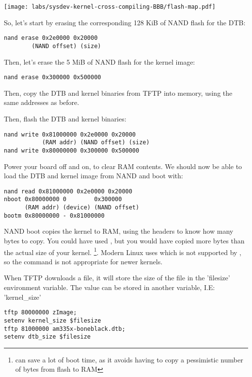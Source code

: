 \begin{center}
  \texttt{[image: labs/sysdev-kernel-cross-compiling-BBB/flash-map.pdf]}
\end{center}

So, let's start by erasing the corresponding 128 KiB of NAND flash
for the DTB:

\begin{verbatim}
nand erase 0x2e0000 0x20000
        (NAND offset) (size)
\end{verbatim}

Then, let's erase the 5 MiB of NAND flash for the kernel image:

\begin{verbatim}
nand erase 0x300000 0x500000
\end{verbatim}

Then, copy the DTB and kernel binaries from TFTP into memory, using the
same addresses as before.

Then, flash the DTB and kernel binaries:

\begin{verbatim}
nand write 0x81000000 0x2e0000 0x20000
           (RAM addr) (NAND offset) (size)
nand write 0x80000000 0x300000 0x500000
\end{verbatim}

Power your board off and on, to clear RAM contents. We should now be
able to load the DTB and kernel image from NAND and boot with:

\begin{verbatim}
nand read 0x81000000 0x2e0000 0x20000
nboot 0x80000000 0        0x300000
      (RAM addr) (device) (NAND offset)
bootm 0x80000000 - 0x81000000
\end{verbatim}

NAND boot  copies the kernel to RAM, using the  headers
to know how many bytes to copy. You could have used , but you would have copied more bytes than
the actual size of your kernel. \footnote{ can save a lot 
of boot time, as it avoids having to copy a pessimistic number of
bytes from flash to RAM}. Modern Linux uses  which is not
supported by , so the command is not appropriate for newer kernels.

When TFTP downloads a file, it will store the size of the file in the 'filesize'
environment variable. The value can be stored in another variable, I.E: 'kernel\_size'

\begin{verbatim}
tftp 80000000 zImage; 
setenv kernel_size $filesize
tftp 81000000 am335x-boneblack.dtb; 
setenv dtb_size $filesize
\end{verbatim}


